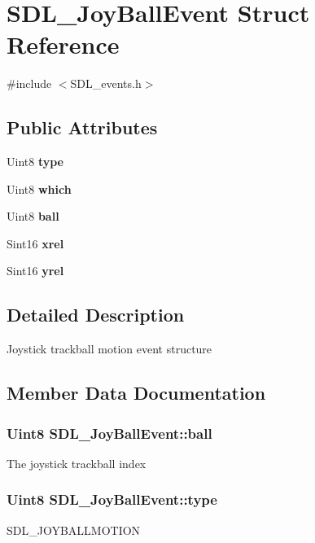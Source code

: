 \section{S\+D\+L\+\_\+\+Joy\+Ball\+Event Struct Reference}
\label{struct_s_d_l___joy_ball_event}


{\ttfamily \#include $<$S\+D\+L\+\_\+events.\+h$>$}

\subsection*{Public Attributes}
\begin{DoxyCompactItemize}
\item 
Uint8 {\bf type}
\item 
Uint8 {\bf which}
\item 
Uint8 {\bf ball}
\item 
Sint16 {\bf xrel}
\item 
Sint16 {\bf yrel}
\end{DoxyCompactItemize}


\subsection{Detailed Description}
Joystick trackball motion event structure 

\subsection{Member Data Documentation}
\subsubsection[{ball}]{\setlength{\rightskip}{0pt plus 5cm}Uint8 S\+D\+L\+\_\+\+Joy\+Ball\+Event\+::ball}\label{struct_s_d_l___joy_ball_event_add4eb0daeaf95ae56e8c7cfcec560242}
The joystick trackball index 
\subsubsection[{type}]{\setlength{\rightskip}{0pt plus 5cm}Uint8 S\+D\+L\+\_\+\+Joy\+Ball\+Event\+::type}\label{struct_s_d_l___joy_ball_event_aa2c2e84ae1814f280dcc4ec37feb8ce3}
S\+D\+L\+\_\+\+J\+O\+Y\+B\+A\+L\+L\+M\+O\+T\+I\+O\+N 

